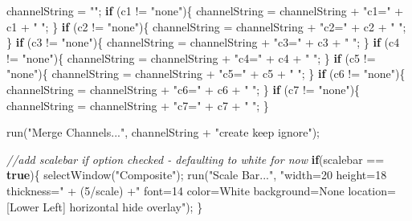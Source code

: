 \documentclass[
  12pt,
  a4paper,
]{book}
\newenvironment{Shaded}{}{}
\newcommand{\CommentTok}[1]{\textcolor[rgb]{0.38,0.63,0.69}{\textit{#1}}}
\newcommand{\ControlFlowTok}[1]{\textcolor[rgb]{0.00,0.44,0.13}{\textbf{#1}}}
\newcommand{\DecValTok}[1]{\textcolor[rgb]{0.25,0.63,0.44}{#1}}
\newcommand{\KeywordTok}[1]{\textcolor[rgb]{0.00,0.44,0.13}{\textbf{#1}}}
\newcommand{\NormalTok}[1]{#1}
\newcommand{\OperatorTok}[1]{\textcolor[rgb]{0.40,0.40,0.40}{#1}}
\newcommand{\StringTok}[1]{\textcolor[rgb]{0.25,0.44,0.63}{#1}}
\begin{document}
\begin{Shaded}
\begin{Highlighting}[]
\NormalTok{channelString }\OperatorTok{=} \StringTok{""}\OperatorTok{;}
\ControlFlowTok{if} \OperatorTok{(}\NormalTok{c1 }\OperatorTok{!=} \StringTok{"none"}\OperatorTok{)\{}\NormalTok{ channelString }\OperatorTok{=}\NormalTok{ channelString }\OperatorTok{+} \StringTok{"c1="} \OperatorTok{+}\NormalTok{ c1 }\OperatorTok{+} \StringTok{" "}\OperatorTok{;} \OperatorTok{\}}
\ControlFlowTok{if} \OperatorTok{(}\NormalTok{c2 }\OperatorTok{!=} \StringTok{"none"}\OperatorTok{)\{}\NormalTok{ channelString }\OperatorTok{=}\NormalTok{ channelString }\OperatorTok{+} \StringTok{"c2="} \OperatorTok{+}\NormalTok{ c2 }\OperatorTok{+} \StringTok{" "}\OperatorTok{;} \OperatorTok{\}}
\ControlFlowTok{if} \OperatorTok{(}\NormalTok{c3 }\OperatorTok{!=} \StringTok{"none"}\OperatorTok{)\{}\NormalTok{ channelString }\OperatorTok{=}\NormalTok{ channelString }\OperatorTok{+} \StringTok{"c3="} \OperatorTok{+}\NormalTok{ c3 }\OperatorTok{+} \StringTok{" "}\OperatorTok{;} \OperatorTok{\}}
\ControlFlowTok{if} \OperatorTok{(}\NormalTok{c4 }\OperatorTok{!=} \StringTok{"none"}\OperatorTok{)\{}\NormalTok{ channelString }\OperatorTok{=}\NormalTok{ channelString }\OperatorTok{+} \StringTok{"c4="} \OperatorTok{+}\NormalTok{ c4 }\OperatorTok{+} \StringTok{" "}\OperatorTok{;} \OperatorTok{\}}
\ControlFlowTok{if} \OperatorTok{(}\NormalTok{c5 }\OperatorTok{!=} \StringTok{"none"}\OperatorTok{)\{}\NormalTok{ channelString }\OperatorTok{=}\NormalTok{ channelString }\OperatorTok{+} \StringTok{"c5="} \OperatorTok{+}\NormalTok{ c5 }\OperatorTok{+} \StringTok{" "}\OperatorTok{;} \OperatorTok{\}}
\ControlFlowTok{if} \OperatorTok{(}\NormalTok{c6 }\OperatorTok{!=} \StringTok{"none"}\OperatorTok{)\{}\NormalTok{ channelString }\OperatorTok{=}\NormalTok{ channelString }\OperatorTok{+} \StringTok{"c6="} \OperatorTok{+}\NormalTok{ c6 }\OperatorTok{+} \StringTok{" "}\OperatorTok{;} \OperatorTok{\}}
\ControlFlowTok{if} \OperatorTok{(}\NormalTok{c7 }\OperatorTok{!=} \StringTok{"none"}\OperatorTok{)\{}\NormalTok{ channelString }\OperatorTok{=}\NormalTok{ channelString }\OperatorTok{+} \StringTok{"c7="} \OperatorTok{+}\NormalTok{ c7 }\OperatorTok{+} \StringTok{" "}\OperatorTok{;} \OperatorTok{\}}

\NormalTok{run}\OperatorTok{(}\StringTok{"Merge Channels..."}\OperatorTok{,}\NormalTok{ channelString }\OperatorTok{+} \StringTok{"create keep ignore"}\OperatorTok{);}

\CommentTok{//add scalebar if option checked {-} defaulting to white for now}
\ControlFlowTok{if}\OperatorTok{(}\NormalTok{scalebar }\OperatorTok{==} \KeywordTok{true}\OperatorTok{)\{}
\NormalTok{    selectWindow}\OperatorTok{(}\StringTok{"Composite"}\OperatorTok{);}
\NormalTok{    run}\OperatorTok{(}\StringTok{"Scale Bar..."}\OperatorTok{,} \StringTok{"width=20 height=18 thickness="} \OperatorTok{+} \OperatorTok{(}\DecValTok{5}\OperatorTok{/}\NormalTok{scale}\OperatorTok{)} \OperatorTok{+}\StringTok{" font=14 color=White background=None location=[Lower Left] horizontal hide overlay"}\OperatorTok{);}
\OperatorTok{\}}


\end{Highlighting}
\end{Shaded}
\end{document}
